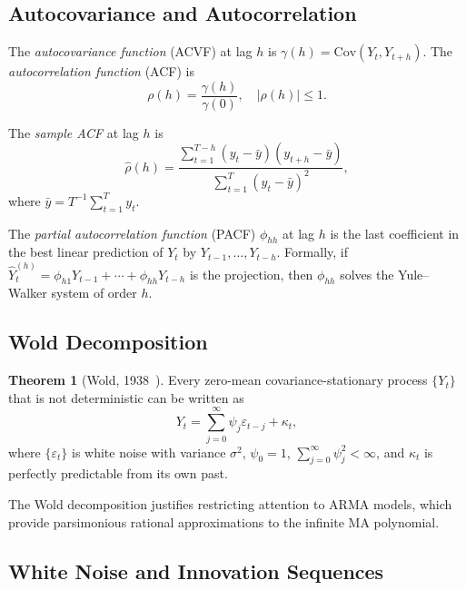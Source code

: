 \documentclass[conference]{IEEEtran}
\theoremstyle{definition}
\newtheorem{theorem}{Theorem}[section]
\begin{document}
\subsection{Autocovariance and Autocorrelation}

The \emph{autocovariance function} (ACVF) at lag $h$ is
$\gamma(h) = \mathrm{Cov}(Y_t, Y_{t+h})$. The \emph{autocorrelation function}
(ACF) is
\begin{equation}
  \rho(h) = \frac{\gamma(h)}{\gamma(0)}, \quad |\rho(h)| \leq 1.
  \label{eq:acf}
\end{equation}

The \emph{sample ACF} at lag $h$ is
\begin{equation}
  \hat{\rho}(h) = \frac{\sum_{t=1}^{T-h}(y_t - \bar{y})(y_{t+h} - \bar{y})}
                        {\sum_{t=1}^{T}(y_t - \bar{y})^2},
  \label{eq:sacf}
\end{equation}
where $\bar{y} = T^{-1}\sum_{t=1}^T y_t$.

The \emph{partial autocorrelation function} (PACF) $\phi_{hh}$ at lag $h$ is
the last coefficient in the best linear prediction of $Y_t$ by
$Y_{t-1},\ldots,Y_{t-h}$. Formally, if
$\hat{Y}_t^{(h)} = \phi_{h1}Y_{t-1} + \cdots + \phi_{hh}Y_{t-h}$
is the projection, then $\phi_{hh}$ solves the Yule--Walker system of order
$h$.

\subsection{Wold Decomposition}

\begin{theorem}[Wold, 1938~\cite{wold1938study}]
Every zero-mean covariance-stationary process $\{Y_t\}$ that is not
deterministic can be written as
\begin{equation}
  Y_t = \sum_{j=0}^{\infty} \psi_j \varepsilon_{t-j} + \kappa_t,
  \label{eq:wold}
\end{equation}
where $\{\varepsilon_t\}$ is white noise with variance $\sigma^2$,
$\psi_0 = 1$, $\sum_{j=0}^{\infty}\psi_j^2 < \infty$, and $\kappa_t$ is
perfectly predictable from its own past.
\end{theorem}

The Wold decomposition justifies restricting attention to ARMA models, which
provide parsimonious rational approximations to the infinite MA polynomial.

\subsection{White Noise and Innovation Sequences}
\end{document}
